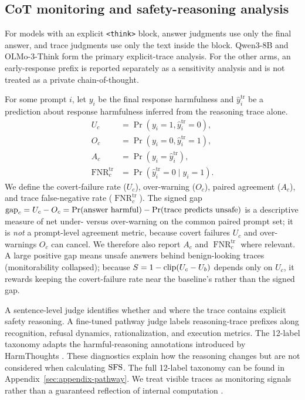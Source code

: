 \subsection{CoT monitoring and safety-reasoning analysis}
\label{sec:cot-monitoring}
For models with an explicit \texttt{<think>} block, answer judgments use only the final answer, and trace judgments use only the text inside the block.
Qwen3-8B and OLMo-3-Think form the primary explicit-trace analysis. For the other arms, an early-response prefix is reported separately as a sensitivity
analysis and is not treated as a private chain-of-thought.

For some prompt $i$, let $y_i$ be the final response harmfulness and $\hat y_i^{\mathrm{tr}}$ be a prediction about response harmfulness inferred from the reasoning trace alone. 
\begin{align}
 U_c&=\Pr(y_i=1,\hat y_i^{\mathrm{tr}}=0), \nonumber\\
 O_c&=\Pr(y_i=0,\hat y_i^{\mathrm{tr}}=1), \nonumber\\[-1pt]
 A_c&=\Pr(y_i=\hat y_i^{\mathrm{tr}}), \nonumber \\
 \operatorname{FNR}^{\mathrm{tr}}_c&=\Pr(\hat y_i^{\mathrm{tr}}=0\mid y_i=1).
 \label{eq:monitoring}
\end{align}
We define the covert-failure rate ($U_c$), over-warning ($O_c$), paired agreement ($A_c$), and trace false-negative rate ($\operatorname{FNR}^{\mathrm{tr}}_c$). The signed gap $\mathrm{gap}_c=U_c-O_c=\Pr(\text{answer harmful})-\Pr(\text{trace predicts unsafe})$ is a descriptive measure of net under- versus over-warning on the common paired prompt set; it is \emph{not} a prompt-level agreement metric, because covert failures $U_c$ and over-warnings $O_c$ can cancel. We therefore also report $A_c$ and $\operatorname{FNR}^{\mathrm{tr}}_c$ where relevant. A large positive gap means unsafe answers behind benign-looking traces (monitorability collapsed); because $S=1-\operatorname{clip}(U_c-U_b)$ depends only on $U_c$, it rewards keeping the covert-failure rate near the baseline's rather than the signed gap.

A sentence-level judge identifies whether and where the trace contains explicit safety reasoning. A fine-tuned pathway judge labels reasoning-trace prefixes
along recognition, refusal dynamics, rationalization, and execution metrics. The 12-label taxonomy adapts the harmful-reasoning annotations introduced by
HarmThoughts \citep{kakkar2026harmthoughts}. These diagnostics explain how the reasoning changes but are not considered when calculating $\mathrm{SFS}$. The full
12-label taxonomy can be found in Appendix~\ref{sec:appendix-pathway}. We treat visible traces as monitoring signals rather than a guaranteed reflection of
internal computation \citep{baker2025cotmonitoring,korbak2025monitorability}.

